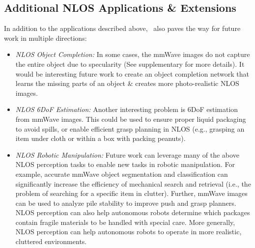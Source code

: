 


\subsection{Additional NLOS Applications \& Extensions}\label{sec:discussion} 

In addition to the applications described above, \name\ also paves the way for future work in multiple directions:
\begin{itemize}
    \item \textit{NLOS Object Completion:} In some cases, the mmWave images do not capture the entire object due to specularity (See supplementary for more details).  It would be interesting future work to create an object completion network that learns the missing parts of an object \& creates more photo-realistic NLOS images.
    \item \textit{NLOS 6DoF Estimation:} Another interesting problem is 6DoF estimation from mmWave images. This could be used to ensure proper liquid packaging to avoid spills, or enable efficient grasp planning in NLOS (e.g., grasping an item under cloth or within a box with packing peanuts).
    \item \textit{NLOS Robotic Manipulation: }Future work can leverage many of the above NLOS perception tasks to enable new tasks in robotic manipulation. For example, accurate mmWave object segmentation and classification can significantly increase the efficiency of mechanical search and retrieval (i.e., the problem of searching for a specific item in clutter).  Further, mmWave images can be used to analyze pile stability to improve push and grasp planners. NLOS perception can also help autonomous robots determine which packages contain fragile materials to be handled with special care. More generally, NLOS perception can help autonomous robots to operate in more realistic, cluttered environments.
\end{itemize}
